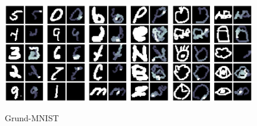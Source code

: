 \begin{figure}[!ht]
    \centering
    \includegraphics[width=0.32\textwidth]{images/resultate/base-mnist-mnist.png}
    \includegraphics[width=0.32\textwidth]{images/resultate/base-mnist-emnist.png}
    \includegraphics[width=0.32\textwidth]{images/resultate/base-mnist-quickdraw.png}
    \caption{Grund-MNIST}
    \label{fig:Grund-MNIST}
\end{figure}
